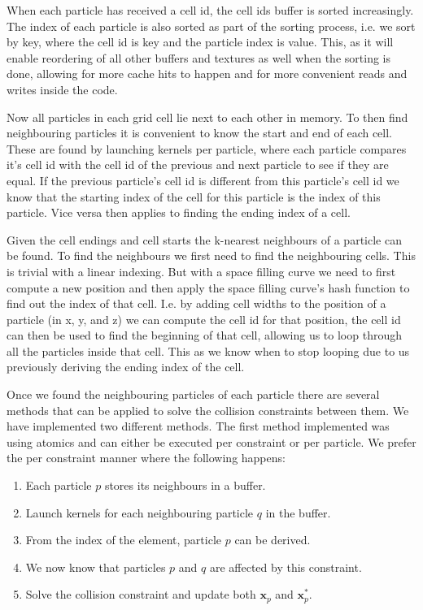 When each particle has received a cell id, the cell ids buffer is sorted
increasingly. The index of each particle is also sorted as part of the sorting
process, i.e. we sort by key, where the cell id is key and the particle index
is value. This, as it will enable reordering of all other buffers and textures
as well when the sorting is done, allowing for more cache hits to happen and
for more convenient reads and writes inside the code.

Now all particles in each grid cell lie next to each other in memory. To then
find neighbouring particles it is convenient to know the start and end of each
cell. These are found by launching kernels per particle, where each particle
compares it's cell id with the cell id of the previous and next particle to see
if they are equal. If the previous particle's cell id is different from this
particle's cell id we know that the starting index of the cell for this
particle is the index of this particle. Vice versa then applies to finding the
ending index of a cell.

Given the cell endings and cell starts the k-nearest neighbours of a particle
can be found. To find the neighbours we first need to find the neighbouring
cells. This is trivial with a linear indexing. But with a space filling curve
we need to first compute a new position and then apply the space filling
curve's hash function to find out the index of that cell. I.e. by adding cell
widths to the position of a particle (in x, y, and z) we can compute the cell
id for that position, the cell id can then be used to find the beginning of
that cell, allowing us to loop through all the particles inside that cell. This
as we know when to stop looping due to us previously deriving the ending index
of the cell.

Once we found the neighbouring particles of each particle there are several
methods that can be applied to solve the collision constraints between them. We
have implemented two different methods. The first method implemented was using
atomics and can either be executed per constraint or per particle. We prefer
the per constraint manner where the following happens:

\begin{enumerate}
\item Each particle $p$ stores its neighbours in a buffer.
\item Launch kernels for each neighbouring particle $q$ in the buffer.
\item From the index of the element, particle $p$ can be derived.
\item We now know that particles $p$ and $q$ are affected by this constraint.
\item Solve the collision constraint and update both $\mathbf{x}_{p}$ and $\mathbf{x}_{p}^{*}$.
\end{enumerate}

